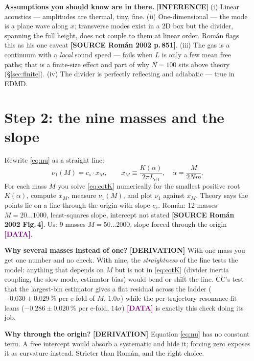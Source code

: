 \documentclass[11pt,a4paper]{article}
\newcommand{\Leff}{L_{\mathrm{eff}}}
\newcommand{\src}[1]{\textcolor{OliveGreen}{\textbf{[SOURCE #1]}}}
\newcommand{\der}{\textcolor{NavyBlue}{\textbf{[DERIVATION]}}}
\newcommand{\infr}{\textcolor{BurntOrange}{\textbf{[INFERENCE]}}}
\newcommand{\dat}{\textcolor{Purple}{\textbf{[DATA]}}}
\begin{document}
\textbf{Assumptions you should know are in there.} \infr{} (i) Linear acoustics --- amplitudes are thermal, tiny, fine. (ii) One-dimensional --- the mode is a plane wave along $x$; transverse modes exist in a $2$D box but the divider, spanning the full height, does not couple to them at linear order. Rom\'an flags this as his one caveat \src{Rom\'an 2002 p.\,851}. (iii) The gas is a continuum with a \emph{local} sound speed --- fails when $L$ is only a few mean free paths; that is a finite-size effect and part of why $N=100$ sits above theory (\S\ref{sec:finite}). (iv) The divider is perfectly reflecting and adiabatic --- true in EDMD.

\section{Step 2: the nine masses and the slope}
\label{sec:ladder}
Rewrite \eqref{eq:nu} as a straight line:
\begin{equation}
\nu_1(M) = c_s \cdot x_M, \qquad x_M \equiv \frac{K(\alpha)}{2\pi \Leff}, \quad \alpha = \frac{M}{2Nm}.
\label{eq:line}
\end{equation}
For each mass $M$ you solve \eqref{eq:cotK} numerically for the smallest positive root $K(\alpha)$, compute $x_M$, measure $\nu_1(M)$, and plot $\nu_1$ against $x_M$. Theory says the points lie on a line through the origin with slope $c_s$. Rom\'an: 12 masses $M = 20\ldots1000$, least-squares slope, intercept not stated \src{Rom\'an 2002 Fig.\,4}. Us: 9 masses $M = 50\ldots2000$, slope forced through the origin \dat{}.

\textbf{Why several masses instead of one?} \der{} With one mass you get one number and no check. With nine, the \emph{straightness} of the line tests the model: anything that depends on $M$ but is not in \eqref{eq:cotK} (divider inertia coupling, the slow mode, estimator bias) would bend or shift the line. CC's test that the largest-bin estimator gives a flat residual across the ladder ($-0.030 \pm 0.029\,\%$ per e-fold of $M$, $1.0\sigma$) while the per-trajectory resonance fit leans ($-0.286\pm0.020\,\%$ per e-fold, $14\sigma$) \dat{} is exactly this check doing its job.

\textbf{Why through the origin?} \der{} Equation \eqref{eq:nu} has no constant term. A free intercept would absorb a systematic and hide it; forcing zero exposes it as curvature instead. Stricter than Rom\'an, and the right choice.
\end{document}
